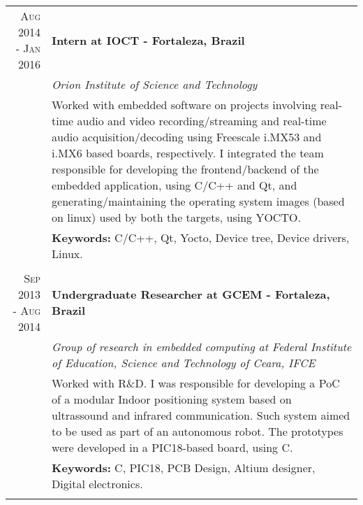 \documentclass[a4paper,10pt]{article}
\begin{document}
\begin{tabular}{r|p{11cm}}
  \textsc{Aug 2014 - Jan 2016} & \textbf{Intern at IOCT - Fortaleza, Brazil}\\&\emph{Orion Institute of Science and Technology}\\&\footnotesize{Worked with embedded software on projects involving real-time audio and video recording/streaming and real-time audio acquisition/decoding using Freescale i.MX53 and i.MX6 based boards, respectively. I integrated the team responsible for developing the frontend/backend of the embedded application, using C/C++ and Qt, and generating/maintaining the operating system images (based on linux) used by both the targets, using YOCTO.}
  \\ & \footnotesize{\textbf{Keywords:} C/C++, Qt, Yocto, Device tree, Device drivers, Linux.}
  \\\multicolumn{2}{c}{} \\

  \textsc{Sep 2013 - Aug 2014} & \textbf{Undergraduate Researcher at GCEM - Fortaleza, Brazil} \\&\emph{Group of research in embedded computing at Federal Institute of Education,
  Science and Technology of Ceara, IFCE}\\&\footnotesize{Worked with R\&D. I was responsible for developing a PoC of a modular Indoor positioning system based on ultrassound and infrared communication. Such system aimed to be used as part of an autonomous robot. The prototypes were developed in a PIC18-based board, using C.}
  \\ & \footnotesize{\textbf{Keywords:} C, PIC18, PCB Design, Altium designer, Digital electronics.}
  \\\multicolumn{2}{c}{}

\end{tabular}

\end{document}
